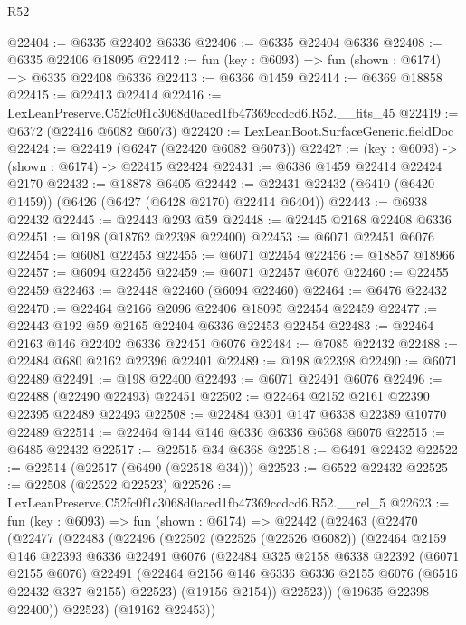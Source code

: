 \begin{lexlean}{R52}
\begin{coremodule}
@22404 := @6335 @22402 @6336
@22406 := @6335 @22404 @6336
@22408 := @6335 @22406 @18095
@22412 := fun (key : @6093) => fun (shown : @6174) => @6335 @22408 @6336
@22413 := @6366 @1459
@22414 := @6369 @18858
@22415 := @22413 @22414
@22416 := LexLeanPreserve.C52fc0f1c3068d0aced1fb47369ccdcd6.R52.__fits_45
@22419 := @6372 (@22416 @6082 @6073)
@22420 := LexLeanBoot.SurfaceGeneric.fieldDoc
@22424 := @22419 (@6247 (@22420 @6082 @6073))
@22427 := (key : @6093) -> (shown : @6174) -> @22415 @22424
@22431 := @6386 @1459 @22414 @22424 @2170
@22432 := @18878 @6405
@22442 := @22431 @22432 (@6410 (@6420 @1459)) (@6426 (@6427 (@6428 @2170) @22414 @6404))
@22443 := @6938 @22432
@22445 := @22443 @293 @59
@22448 := @22445 @2168 @22408 @6336
@22451 := @198 (@18762 @22398 @22400)
@22453 := @6071 @22451 @6076
@22454 := @6081 @22453
@22455 := @6071 @22454
@22456 := @18857 @18966
@22457 := @6094 @22456
@22459 := @6071 @22457 @6076
@22460 := @22455 @22459
@22463 := @22448 @22460 (@6094 @22460)
@22464 := @6476 @22432
@22470 := @22464 @2166 @2096 @22406 @18095 @22454 @22459
@22477 := @22443 @192 @59 @2165 @22404 @6336 @22453 @22454
@22483 := @22464 @2163 @146 @22402 @6336 @22451 @6076
@22484 := @7085 @22432
@22488 := @22484 @680 @2162 @22396 @22401
@22489 := @198 @22398
@22490 := @6071 @22489
@22491 := @198 @22400
@22493 := @6071 @22491 @6076
@22496 := @22488 (@22490 @22493) @22451
@22502 := @22464 @2152 @2161 @22390 @22395 @22489 @22493
@22508 := @22484 @301 @147 @6338 @22389 @10770 @22489
@22514 := @22464 @144 @146 @6336 @6336 @6368 @6076
@22515 := @6485 @22432
@22517 := @22515 @34 @6368
@22518 := @6491 @22432
@22522 := @22514 (@22517 (@6490 (@22518 @34)))
@22523 := @6522 @22432
@22525 := @22508 (@22522 @22523)
@22526 := LexLeanPreserve.C52fc0f1c3068d0aced1fb47369ccdcd6.R52.__rel_5
@22623 := fun (key : @6093) =>
  fun (shown : @6174) =>
  @22442
    (@22463
      (@22470
        (@22477
          (@22483
            (@22496
              (@22502
                (@22525 (@22526 @6082))
                (@22464
                  @2159
                  @146
                  @22393
                  @6336
                  @22491
                  @6076
                  (@22484
                    @325
                    @2158
                    @6338
                    @22392
                    (@6071 @2155 @6076)
                    @22491
                    (@22464 @2156 @146 @6336 @6336 @2155 @6076 (@6516 @22432 @327 @2155) @22523)
                    (@19156 @2154))
                  @22523))
              (@19635 @22398 @22400))
            @22523)
          (@19162 @22453))

\end{coremodule}
\end{lexlean}
